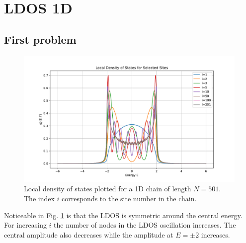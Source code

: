 \section{LDOS 1D}

\subsection{First problem}

\begin{figure}[H]
    \centering    \includegraphics[width=\textwidth]{Figures/task1.pdf}
    \caption{Local density of states plotted for a 1D chain of length $N=501$. The index $i$ corresponds to the site number in the chain.}
    \label{fig:task1}
\end{figure}
Noticeable in Fig. \ref{fig:task1} is that the LDOS is symmetric around the central energy. For increasing $i$ the number of nodes in the LDOS oscillation increases. The central amplitude also decreases while the amplitude at $E = \pm 2$ increases.